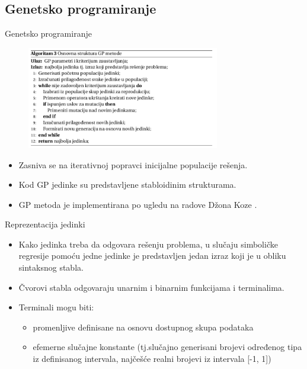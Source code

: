 \documentclass{beamer}
\begin{document}
\subsection{Genetsko programiranje}
\begin{frame}{Genetsko programiranje}

\begin{figure}[!ht]
\begin{center}
\includegraphics[width=0.75\textwidth]{images/gp_alg.png}
\end{center}
\label{fig:polyReg}
\end{figure}

\begin{itemize}
    \item Zasniva se na iterativnoj popravci inicijalne populacije rešenja.
    \item Kod GP jedinke su predstavljene stabloidinim strukturama.
    \item GP metoda je implementirana po ugledu na radove Džona Koze \cite{koza}.
\end{itemize}
\end{frame}

\begin{frame}{Reprezentacija jedinki}
\begin{itemize}
    \item Kako jedinka treba da odgovara rešenju problema, u slučaju simboličke regresije pomoću jedne jedinke je predstavljen jedan izraz koji je u obliku sintaksnog stabla.
    \item Čvorovi stabla odgovaraju unarnim i binarnim funkcijama i terminalima.
    \item Terminali mogu biti:
    \begin{itemize}
        \item promenljive definisane na osnovu dostupnog skupa podataka
        \item efemerne slučajne konstante (tj.slučajno generisani brojevi određenog tipa iz definisanog intervala, najčešće realni brojevi iz intervala [-1, 1])
    \end{itemize}
\end{itemize}
\end{frame}
\end{document}
